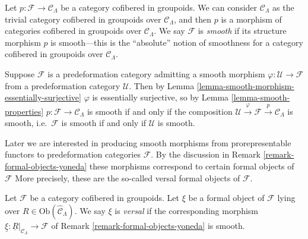\begin{remark}
\label{remark-cofibered-groupoid-projection-smooth}
Let $p: \mathcal{F} \to \mathcal{C}_\Lambda$ be a category cofibered in 
groupoids. We can consider $\mathcal{C}_\Lambda$ as the trivial category 
cofibered in groupoids over $\mathcal{C}_\Lambda$, and then $p$ is a morphism 
of categories cofibered in groupoids over $\mathcal{C}_\Lambda$.  We say 
$\mathcal{F}$ is {\it smooth} if its structure morphism $p$ is smooth---this is 
the ``absolute'' notion of smoothness for a category cofibered in groupoids 
over $\mathcal{C}_\Lambda$.
\end{remark}

\begin{remark}
\label{remark-smooth-on-top}
Suppose $\mathcal{F}$ is a predeformation category admitting a smooth morphism 
$\varphi: \mathcal U \to \mathcal{F}$ from a predeformation category 
$\mathcal U$.  Then by
Lemma \ref{lemma-smooth-morphism-essentially-surjective} 
$\varphi$ is essentially surjective, so by
Lemma \ref{lemma-smooth-properties} 
$p: \mathcal{F} \to \mathcal{C}_\Lambda$ is smooth if and only if the 
composition $\mathcal U \xrightarrow{\varphi} \mathcal{F} \xrightarrow{p} 
\mathcal{C}_\Lambda$ is smooth, i.e.\ $\mathcal{F}$ is smooth if and only if 
$\mathcal U$ is smooth.
\end{remark}

\noindent
Later we are interested in producing smooth morphisms from
prorepresentable functors to predeformation categories $\mathcal{F}$.
By the discussion in
Remark \ref{remark-formal-objects-yoneda}
these morphisms correspond to certain formal objects of $\mathcal{F}$
More precisely, these are the so-called versal formal objects of $\mathcal{F}$.

\begin{definition}
\label{definition-versal}
Let $\mathcal{F}$ be a category cofibered in groupoids.  Let $\xi$ be a formal 
object of $\mathcal{F}$ lying over $R \in \text{Ob}(\widehat{\mathcal 
C}_\Lambda)$.  We say $\xi$ is {\it versal} if the corresponding morphism 
$\underline{\xi}: \underline{R}|_{\mathcal{C}_\Lambda} \to \mathcal{F}$ 
of Remark \ref{remark-formal-objects-yoneda} is smooth.
\end{definition}


